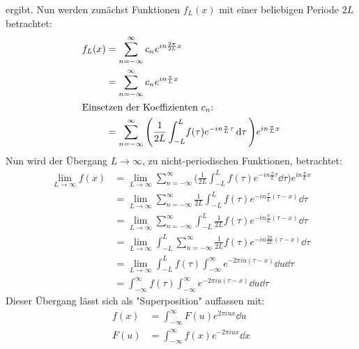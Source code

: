 		ergibt. Nun werden zunächst Funktionen \( f_L(x) \) mit einer beliebigen Periode \( 2L \) betrachtet:
		\begin{align*}
			f_L(x) & = \sum_{n = -\infty}^{\infty} c_n e^{in \frac{2\pi}{2L} x}                                                                                    \\
			       & = \sum_{n = -\infty}^{\infty} c_n e^{in \frac{\pi}{L} x}                                                                                      \\
			\intertext{Einsetzen der Koeffizienten \(c_n\):}
			       & = \sum_{n = -\infty}^{\infty} \Bigg( \frac{1}{2L} \int_{-L}^{L} \! f(\tau) e^{-in \frac{\pi}{L} \tau} \dd{\tau} \Bigg) e^{in \frac{\pi}{L} x}
		\end{align*}
		Nun wird der Übergang \( L \to \infty \), \dh zu nicht-periodischen Funktionen, betrachtet:
		\begin{align*}
			\lim\limits_{L \to \infty} f(x)
			 & = \lim\limits_{L \to \infty} \sum_{n = -\infty}^{\infty} \Bigg( \frac{1}{2L} \int_{-L}^{L} \! f(\tau) e^{-in \frac{\pi}{L} \tau} \dd{\tau} \Bigg) e^{in \frac{\pi}{L} x} \\
			 & = \lim\limits_{L \to \infty} \sum_{n = -\infty}^{\infty} \frac{1}{2L} \int_{-L}^{L} \! f(\tau) e^{-in \frac{\pi}{L} (\tau - x)} \dd{\tau}                                \\
			 & = \lim\limits_{L \to \infty} \sum_{n = -\infty}^{\infty} \int_{-L}^{L} \! \frac{1}{2L} f(\tau) e^{-in \frac{\pi}{L} (\tau - x)} \dd{\tau}                                \\
			 & = \lim\limits_{L \to \infty} \int_{-L}^{L} \sum_{n = -\infty}^{\infty} \frac{1}{2L} f(\tau) e^{-in \frac{2\pi}{2L} (\tau - x)} \dd{\tau}                                 \\
			 & = \lim\limits_{L \to \infty} \int_{-L}^{L} \! f(\tau) \int_{-\infty}^{\infty} \! e^{-2\pi i u (\tau - x)} \dd{u} \dd{\tau}                                               \\
			 & = \int_{-\infty}^{\infty} \! f(\tau) \int_{-\infty}^{\infty} \! e^{-2\pi i u (\tau - x)} \dd{u} \dd{\tau}
		\end{align*}
		Dieser Übergang lässt sich als "Superposition" auffassen mit:
		\begin{align*}
			f(x) & = \int_{-\infty}^{\infty} \! F(u) e^{ 2\pi i u x} \dd{u} \\
			F(u) & = \int_{-\infty}^{\infty} \! f(x) e^{-2\pi i u x} \dd{x}
		\end{align*}

